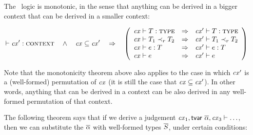 The \MS\ logic is monotonic, in the sense that anything can be derived in a
bigger context that can be derived in a smaller context:

\begin{theorem}\label{thm-mono}
\[
\cxwf{\cx'}\ \ \AND\ \ \cx\subseteq\cx'\ \ \IMPLIES\ \
\left(
\begin{array}{l@{\ \ \IMPLIES\ \ }l}
\istyO{\typ}                     & \isty{\cx'}{\typ}                     \\
\issubO{\typ_1}{\tspred}{\typ_2} & \issub{\cx'}{\typ_1}{\tspred}{\typ_2} \\
\hastyO{\expr}{\typ}             & \hasty{\cx'}{\expr}{\typ}             \\
\theoO{\expr}                    & \theo{\cx'}{\expr}
\end{array}
\right)
\]
\end{theorem}

Note that the monotonicity theorem above also applies to the case in which
$\mathit{cx}'$ is a (well-formed) permutation of $\mathit{cx}$ (it is still the case that
$\mathit{cx}\subseteq\mathit{cx}'$). In other words, anything that can be derived in a context
can be also derived in any well-formed permutation of that context.

The following theorem says that if we derive a judgement
$\mathit{cx}_1,\mathsf{tvar}\ \overline{\alpha},\mathit{cx}_3\vdash\ldots$, then we can substitute the $\overline{\alpha}$
with well-formed types $\overline{S}$, under certain conditions:

